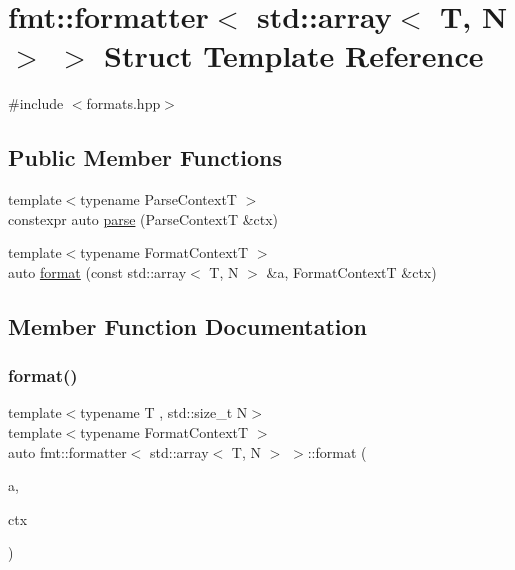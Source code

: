 \hypertarget{structfmt_1_1formatter_3_01std_1_1array_3_01_t_00_01_n_01_4_01_4}{}\section{fmt\+:\+:formatter$<$ std\+:\+:array$<$ T, N $>$ $>$ Struct Template Reference}
\label{structfmt_1_1formatter_3_01std_1_1array_3_01_t_00_01_n_01_4_01_4}


{\ttfamily \#include $<$formats.\+hpp$>$}

\subsection*{Public Member Functions}
\begin{DoxyCompactItemize}
\item 
{\footnotesize template$<$typename Parse\+ContextT $>$ }\\constexpr auto \mbox{\hyperlink{structfmt_1_1formatter_3_01std_1_1array_3_01_t_00_01_n_01_4_01_4_ad7ce9e0afb4b059a6d6fbf70dfeca616}{parse}} (Parse\+ContextT \&ctx)
\item 
{\footnotesize template$<$typename Format\+ContextT $>$ }\\auto \mbox{\hyperlink{structfmt_1_1formatter_3_01std_1_1array_3_01_t_00_01_n_01_4_01_4_ac65283b1f11fc155f7fab7746f09835d}{format}} (const std\+::array$<$ T, N $>$ \&a, Format\+ContextT \&ctx)
\end{DoxyCompactItemize}


\subsection{Member Function Documentation}
\mbox{\label{structfmt_1_1formatter_3_01std_1_1array_3_01_t_00_01_n_01_4_01_4_ac65283b1f11fc155f7fab7746f09835d}} 
\subsubsection{\texorpdfstring{format()}{format()}}
{\footnotesize\ttfamily template$<$typename T , std\+::size\+\_\+t N$>$ \\
template$<$typename Format\+ContextT $>$ \\
auto fmt\+::formatter$<$ std\+::array$<$ T, N $>$ $>$\+::format (\begin{DoxyParamCaption}\item[{const std\+::array$<$ T, N $>$ \&}]{a,  }\item[{Format\+ContextT \&}]{ctx }\end{DoxyParamCaption})}

